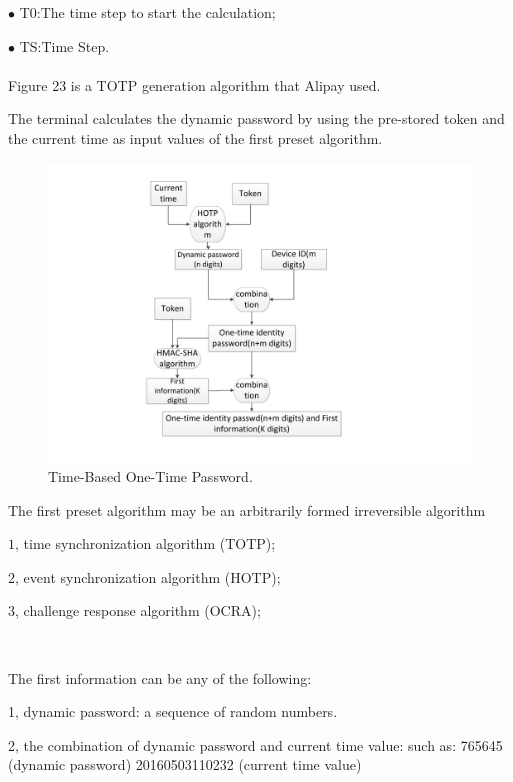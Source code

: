 \documentclass[journal]{IEEEtran}
\begin{document}
$\bullet$ T0:The time step to start the calculation;

$\bullet$ TS:Time Step.
\\
\\





Figure 23 is a TOTP generation algorithm that Alipay used.

The terminal calculates the dynamic password by using the pre-stored token and the current time as input values of the first preset algorithm.

\begin{figure}[htbp]
\centerline{\includegraphics[scale=0.55]{TOTP.pdf}}
\caption{Time-Based One-Time Password.}
\label{fig}
\end{figure}



The first preset algorithm may be an arbitrarily formed irreversible algorithm
                           
                           $1$, time synchronization algorithm (TOTP);
 
                           $2$, event synchronization algorithm (HOTP);

                           $3$, challenge response algorithm (OCRA);

\


The first information can be any of the following:

1, dynamic password: a sequence of random numbers.

2, the combination of dynamic password and current time value: such as: 765645 (dynamic password) 20160503110232 (current time value)
\end{document}
